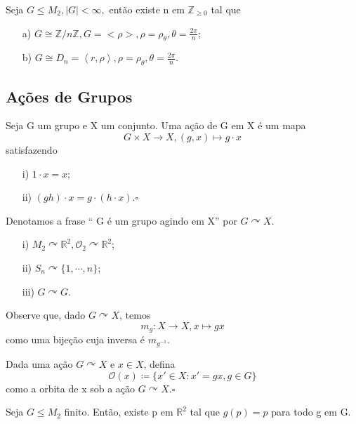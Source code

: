 \documentclass[Algebra/algebra_notes.tex]{subfiles}
\begin{document}
\begin{crl*}
	Seja \(G\leq M_{2}, |G| < \infty,\) então existe n em \(\mathbb{Z}_{\geq 0}\) tal que
	\begin{itemize}
		\item[a)] \(G\cong{\mathbb{Z}/n \mathbb{Z}}, G = <\rho >, \rho =\rho _{\theta }, \theta =\frac{2\pi }{n}\);
		\item[b)] \(G\cong{D_{n}}=\left< r, \rho  \right>, \rho =\rho _{\theta }, \theta =\frac{2\pi }{n}\).
	\end{itemize}
\end{crl*}
\subsection{Ações de Grupos}
\begin{def*}
	Seja G um grupo e X um conjunto. Uma ação de G em X é um mapa
	\[
		G\times{X}\rightarrow X, (g,x)\mapsto g \cdot x
	\]
	satisfazendo
	\begin{itemize}
		\item[i)] \(1 \cdot x = x;\)
		\item[ii)] \((gh)\cdot x= g \cdot (h \cdot x). \square\)
	\end{itemize}
\end{def*}
Denotamos a frase `` G é um grupo agindo em X'' por \(G \curvearrowright X\).
\begin{example*}
	\begin{itemize}
		\item[i)] \(M_{2} \curvearrowright \mathbb{R}^{2}, \mathcal{O}_{2} \curvearrowright \mathbb{R}^{2}\);
		\item[ii)] \(S_{n}\curvearrowright \{1, \cdots, n\}\);
		\item[iii)] \(G \curvearrowright G\).
	\end{itemize}
\end{example*}
Observe que, dado \(G \curvearrowright X\), temos
\[
	m_{g}:X\rightarrow X, x\mapsto gx
\]
como uma bijeção cuja inversa é \(m_{g^{-1}}\).
\begin{def*}
	Dada uma ação \(G \curvearrowright X\) e \(x\in X\), defina
	\[
		\mathcal{O}(x)\coloneqq \{x'\in X: x'=gx, g\in G\}
	\]
	como a orbita de x sob a ação \(G \curvearrowright X.\square\)
\end{def*}
\hypertarget{fixed_pt}{
	\begin{theorem*}
		Seja \(G\leq M_{2}\) finito. Então, existe p em \(\mathbb{R}^{2}\) tal que
		\(g(p)=p\) para todo g em G.
	\end{theorem*}
}
\end{document}
